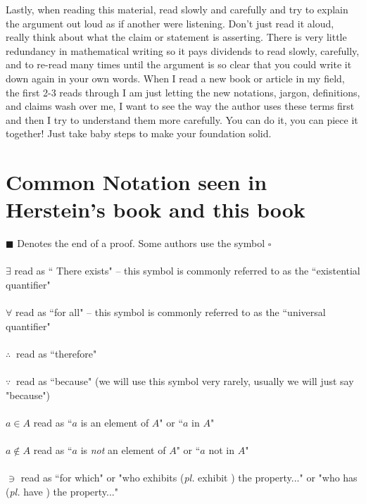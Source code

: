 Lastly, when reading this material, read slowly and carefully and try to explain the argument out loud as if another were listening. Don't just read it aloud, really think about what the claim or statement is asserting. There is very little redundancy in mathematical writing so it pays dividends to read slowly, carefully, and to re-read many times until the argument is so clear that you could write it down again in your own words. When I read a new book or article in my field, the first 2-3 reads through I am just letting the new notations, jargon, definitions, and claims wash over me, I want to see the way the author uses these terms first and then I try to understand them more carefully. You can do it, you can piece it together! Just take baby steps to make your foundation solid. \newpage
\section{Common Notation seen in Herstein's book and this book}
$\blacksquare$ Denotes the end of a proof. Some authors  use the symbol \index{$\blacksquare$} $\square$\\ \\
$\exists$ read as `` There exists" \index{$\exists$} -- this symbol is commonly referred to as the ``existential quantifier"\\ \\
$\forall$ read as ``for all" \index{$\forall$} -- this symbol is commonly referred to as the ``universal quantifier"\\ \\
$\therefore \ $  read as ``therefore" \index{$\therefore \ $}\\ \\
$\because \ $ read as ``because" (we will use this symbol very rarely, usually we will just say "because")  \index{$\because \ $}\\ \\
$a\in A$ read as ``$a$ is an element of $A$" or ``$a$ in $A$" \index{$\in$} \\ \\
$a\not\in A$ read as ``$a$ is \textit{not} an element of $A$" or ``$a$ not in $A$" \\ \\ \index{$\not\in$}
$\ni$ read as ``for which" or "who exhibits (\textit{pl.} exhibit ) the property..." or "who has (\textit{pl.} have ) the property..." \index{$\ni$}\\ \\

